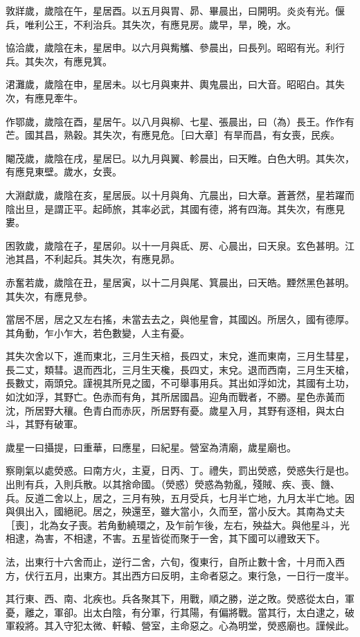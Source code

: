 敦牂歲，歲陰在午，星居酉。以五月與胃、昴、畢晨出，曰開明。炎炎有光。偃兵，唯利公王，不利治兵。其失次，有應見房。歲早，旱，晚，水。

協洽歲，歲陰在未，星居申。以六月與觜觿、參晨出，曰長列。昭昭有光。利行兵。其失次，有應見箕。

涒灘歲，歲陰在申，星居未。以七月與東井、輿鬼晨出，曰大音。昭昭白。其失次，有應見牽牛。

作鄂歲，歲陰在酉，星居午。以八月與柳、七星、張晨出，曰（為）長王。作作有芒。國其昌，熟穀。其失次，有應見危。［曰大章］有旱而昌，有女喪，民疾。

閹茂歲，歲陰在戌，星居巳。以九月與翼、軫晨出，曰天睢。白色大明。其失次，有應見東壁。歲水，女喪。

大淵獻歲，歲陰在亥，星居辰。以十月與角、亢晨出，曰大章。蒼蒼然，星若躍而陰出旦，是謂正平。起師旅，其率必武，其國有德，將有四海。其失次，有應見婁。

困敦歲，歲陰在子，星居卯。以十一月與氐、房、心晨出，曰天泉。玄色甚明。江池其昌，不利起兵。其失次，有應見昴。

赤奮若歲，歲陰在丑，星居寅，以十二月與尾、箕晨出，曰天皓。黫然黑色甚明。其失次，有應見參。

當居不居，居之又左右搖，未當去去之，與他星會，其國凶。所居久，國有德厚。其角動，乍小乍大，若色數變，人主有憂。

其失次舍以下，進而東北，三月生天棓，長四丈，末兌，進而東南，三月生彗星，長二丈，類彗。退而西北，三月生天欃，長四丈，末兌。退而西南，三月生天槍，長數丈，兩頭兌。謹視其所見之國，不可舉事用兵。其出如浮如沈，其國有土功，如沈如浮，其野亡。色赤而有角，其所居國昌。迎角而戰者，不勝。星色赤黃而沈，所居野大穰。色青白而赤灰，所居野有憂。歲星入月，其野有逐相，與太白斗，其野有破軍。

歲星一曰攝提，曰重華，曰應星，曰紀星。營室為清廟，歲星廟也。

察剛氣以處熒惑。曰南方火，主夏，日丙、丁。禮失，罰出熒惑，熒惑失行是也。出則有兵，入則兵散。以其捨命國。（熒惑）熒惑為勃亂，殘賊、疾、喪、饑、兵。反道二舍以上，居之，三月有殃，五月受兵，七月半亡地，九月太半亡地。因與俱出入，國絕祀。居之，殃還至，雖大當小，久而至，當小反大。其南為丈夫［喪］，北為女子喪。若角動繞環之，及乍前乍後，左右，殃益大。與他星斗，光相逮，為害，不相逮，不害。五星皆從而聚于一舍，其下國可以禮致天下。

法，出東行十六舍而止，逆行二舍，六旬，復東行，自所止數十舍，十月而入西方，伏行五月，出東方。其出西方曰反明，主命者惡之。東行急，一日行一度半。

其行東、西、南、北疾也。兵各聚其下，用戰，順之勝，逆之敗。熒惑從太白，軍憂，離之，軍卻。出太白陰，有分軍，行其陽，有偏將戰。當其行，太白逮之，破軍殺將。其入守犯太微、軒轅、營室，主命惡之。心為明堂，熒惑廟也。謹候此。

